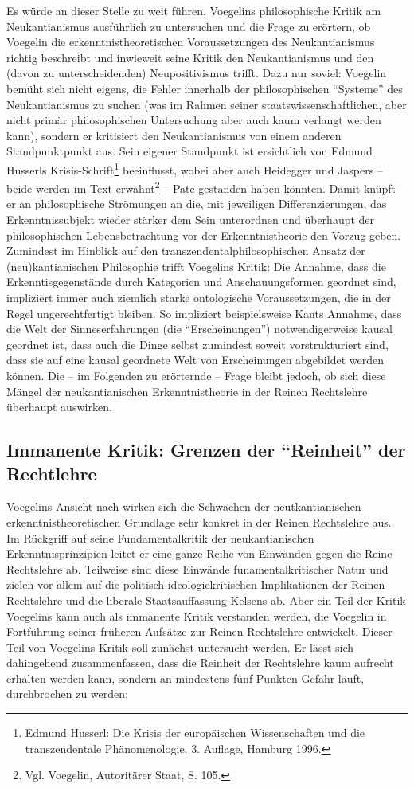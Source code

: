 \documentclass[12pt,a4paper,ngerman]{article}
\begin{document}
Es würde an dieser Stelle zu weit führen, Voegelins philosophische
Kritik am Neukantianismus ausführlich zu untersuchen und die Frage zu
erörtern, ob Voegelin die erkenntnistheoretischen Voraussetzungen des
Neukantianismus richtig beschreibt und inwieweit seine Kritik den
Neukantianismus und den (davon zu unterscheidenden) Neupositivismus
trifft. Dazu nur soviel: Voegelin bemüht sich nicht eigens, die Fehler
innerhalb der philosophischen "`Systeme"' des Neukantianismus zu
suchen (was im Rahmen seiner staatswissenschaftlichen, aber nicht
primär philosophischen Untersuchung aber auch kaum verlangt werden
kann), sondern er kritisiert den Neukantianismus von einem anderen
Standpunktpunkt aus. Sein eigener Standpunkt ist ersichtlich von
Edmund Husserls Krisis-Schrift\footnote{Edmund Husserl: Die Krisis der
  europäischen Wissenschaften und die transzendentale Phänomenologie,
  3. Auflage, Hamburg 1996.}  beeinflusst, wobei aber auch Heidegger
und Jaspers -- beide werden im Text erwähnt\footnote{Vgl.  Voegelin,
  Autoritärer Staat, S. 105.} -- Pate gestanden haben könnten. Damit
knüpft er an philosophische Strömungen an die, mit jeweiligen
Differenzierungen, das Erkenntnissubjekt wieder stärker dem Sein
unterordnen und überhaupt der philosophischen Lebensbetrachtung vor
der Erkenntnistheorie den Vorzug geben. Zumindest im Hinblick auf den
transzendentalphilosophischen Ansatz der (neu)kantianischen Philosophie
trifft Voegelins Kritik: Die Annahme, dass die Erkenntisgegenstände
durch Kategorien und Anschauungsformen geordnet sind, impliziert immer
auch ziemlich starke ontologische Voraussetzungen, die in der Regel
ungerechtfertigt bleiben. So impliziert beispielsweise Kants Annahme,
dass die Welt der Sinneserfahrungen (die "`Erscheinungen"')
notwendigerweise kausal geordnet ist, dass auch die Dinge selbst
zumindest soweit vorstrukturiert sind, dass sie auf eine kausal
geordnete Welt von Erscheinungen abgebildet werden können. Die -- im
Folgenden zu erörternde -- Frage bleibt jedoch, ob sich diese Mängel
der neukantianischen Erkenntnistheorie in der Reinen Rechtslehre
überhaupt auswirken.

\subsection{Immanente Kritik: Grenzen der "`Reinheit"' der Rechtlehre}

Voegelins Ansicht nach wirken sich die Schwächen der neutkantianischen
erkenntnistheoretischen Grundlage sehr konkret in der Reinen
Rechtslehre aus. Im Rückgriff auf seine Fundamentalkritik der
neukantianischen Erkenntnisprinzipien leitet er eine ganze Reihe von
Einwänden gegen die Reine Rechtslehre ab. Teilweise sind diese
Einwände funamentalkritischer Natur und zielen vor allem auf die
politisch-ideologiekritischen Implikationen der Reinen Rechtslehre und
die liberale Staatsauffassung Kelsens ab. Aber ein Teil der Kritik
Voegelins kann auch als immanente Kritik verstanden werden, die
Voegelin in Fortführung seiner früheren Aufsätze zur Reinen
Rechtslehre entwickelt. Dieser Teil von Voegelins Kritik soll zunächst
untersucht werden. Er lässt sich dahingehend zusammenfassen, dass die
Reinheit der Rechtslehre kaum aufrecht erhalten werden kann, sondern
an mindestens fünf Punkten Gefahr läuft, durchbrochen zu werden:
\end{document}

